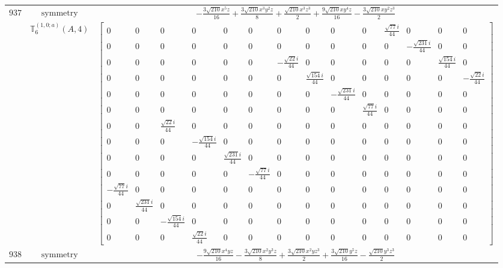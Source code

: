 \documentclass[fleqn,8pt,landscape]{jsarticle}
\begin{document}
\begin{longtable}{ccc}
$ 937 $ & $ \text{symmetry} $ & $ - \frac{3 \sqrt{210} x^{5} z}{16} + \frac{3 \sqrt{210} x^{3} y^{2} z}{8} + \frac{\sqrt{210} x^{3} z^{3}}{2} + \frac{9 \sqrt{210} x y^{4} z}{16} - \frac{3 \sqrt{210} x y^{2} z^{3}}{2} $ \\
$  $ & $ \mathbb{T}_{6}^{(1,0;a)}(A,4) $ & $ \begin{bmatrix} 0 & 0 & 0 & 0 & 0 & 0 & 0 & 0 & 0 & 0 & \frac{\sqrt{77} i}{44} & 0 & 0 & 0 \\ 0 & 0 & 0 & 0 & 0 & 0 & 0 & 0 & 0 & 0 & 0 & - \frac{\sqrt{231} i}{44} & 0 & 0 \\ 0 & 0 & 0 & 0 & 0 & 0 & - \frac{\sqrt{22} i}{44} & 0 & 0 & 0 & 0 & 0 & \frac{\sqrt{154} i}{44} & 0 \\ 0 & 0 & 0 & 0 & 0 & 0 & 0 & \frac{\sqrt{154} i}{44} & 0 & 0 & 0 & 0 & 0 & - \frac{\sqrt{22} i}{44} \\ 0 & 0 & 0 & 0 & 0 & 0 & 0 & 0 & - \frac{\sqrt{231} i}{44} & 0 & 0 & 0 & 0 & 0 \\ 0 & 0 & 0 & 0 & 0 & 0 & 0 & 0 & 0 & \frac{\sqrt{77} i}{44} & 0 & 0 & 0 & 0 \\ 0 & 0 & \frac{\sqrt{22} i}{44} & 0 & 0 & 0 & 0 & 0 & 0 & 0 & 0 & 0 & 0 & 0 \\ 0 & 0 & 0 & - \frac{\sqrt{154} i}{44} & 0 & 0 & 0 & 0 & 0 & 0 & 0 & 0 & 0 & 0 \\ 0 & 0 & 0 & 0 & \frac{\sqrt{231} i}{44} & 0 & 0 & 0 & 0 & 0 & 0 & 0 & 0 & 0 \\ 0 & 0 & 0 & 0 & 0 & - \frac{\sqrt{77} i}{44} & 0 & 0 & 0 & 0 & 0 & 0 & 0 & 0 \\ - \frac{\sqrt{77} i}{44} & 0 & 0 & 0 & 0 & 0 & 0 & 0 & 0 & 0 & 0 & 0 & 0 & 0 \\ 0 & \frac{\sqrt{231} i}{44} & 0 & 0 & 0 & 0 & 0 & 0 & 0 & 0 & 0 & 0 & 0 & 0 \\ 0 & 0 & - \frac{\sqrt{154} i}{44} & 0 & 0 & 0 & 0 & 0 & 0 & 0 & 0 & 0 & 0 & 0 \\ 0 & 0 & 0 & \frac{\sqrt{22} i}{44} & 0 & 0 & 0 & 0 & 0 & 0 & 0 & 0 & 0 & 0 \end{bmatrix} $ \\ \hline
$ 938 $ & $ \text{symmetry} $ & $ - \frac{9 \sqrt{210} x^{4} y z}{16} - \frac{3 \sqrt{210} x^{2} y^{3} z}{8} + \frac{3 \sqrt{210} x^{2} y z^{3}}{2} + \frac{3 \sqrt{210} y^{5} z}{16} - \frac{\sqrt{210} y^{3} z^{3}}{2} $ \\

\end{longtable}
\end{document}
